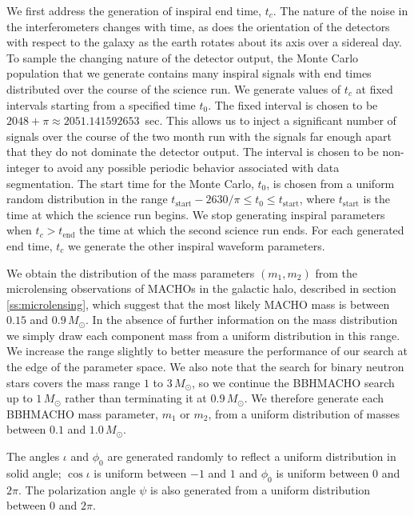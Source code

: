 We first address the generation of inspiral end time, $t_c$. The nature of the
noise in the interferometers changes with time, as does the orientation of the
detectors with respect to the galaxy as the earth rotates about its axis over
a sidereal day. To sample the changing nature of the detector output, the
Monte Carlo population that we generate contains many inspiral signals with
end times distributed over the course of the science run. We generate values
of $t_c$ at fixed intervals starting from a specified time $t_0$. The fixed
interval is chosen to be $2048+\pi \approx 2051.141592653$~sec. This
allows us to inject a significant number of signals over the course of the two
month run with the signals far enough apart that they do not dominate the
detector output. The interval is chosen to be non-integer to avoid any
possible periodic behavior associated with data segmentation.
The start time for the Monte Carlo, $t_0$, is chosen from a uniform random
distribution in the range $t_\mathrm{start} - 2630/\pi \le t_0 \le
t_\mathrm{start}$, where $t_\mathrm{start}$ is the time at which the science
run begins. We stop generating inspiral parameters when $t_c > t_\mathrm{end}$
the time at which the second science run ends. For each generated end time,
$t_c$ we generate the other inspiral waveform parameters.

We obtain the distribution of the mass parameters $(m_1,m_2)$ from the
microlensing observations of MACHOs in the galactic halo, described in section
\ref{ss:microlensing}, which suggest that the most likely MACHO mass is between
$0.15$ and $0.9\,M_\odot$. In the absence of further information on the mass
distribution we simply draw each component mass from a uniform
distribution in this range. We increase the range slightly to better measure
the performance of our search at the edge of the parameter space. We also note
that the search for binary neutron stars covers the mass range $1$ to
$3\,M_\odot$, so we continue the BBHMACHO search up to $1\,M_\odot$ rather
than terminating it at $0.9\,M_\odot$. We therefore generate each BBHMACHO
mass parameter, $m_1$ or $m_2$, from a uniform distribution of masses between
$0.1$ and $1.0\,M_\odot$.

The angles $\iota$ and $\phi_0$ are generated randomly to reflect a uniform
distribution in solid angle; $\cos \iota$ is uniform between $-1$ and $1$ and
$\phi_0$ is uniform between $0$ and $2\pi$. The polarization angle $\psi$ is
also generated from a uniform distribution between $0$ and $2\pi$.


